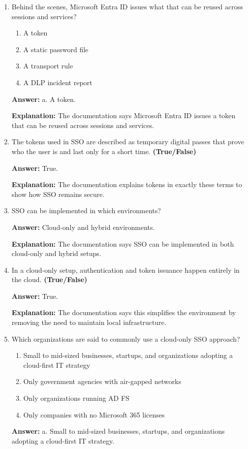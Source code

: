 \documentclass[10pt]{article}
\begin{document}
\begin{enumerate}[leftmargin=*]
\textbf{Explanation:} All of these services are explicitly named in the documentation as examples of SSO access across Microsoft and non-Microsoft apps.

\item Behind the scenes, Microsoft Entra ID issues what that can be reused across sessions and services?
\begin{enumerate}[label=\alph*., leftmargin=1.5em]
\item A token
\item A static password file
\item A transport rule
\item A DLP incident report
\end{enumerate}
\textbf{Answer:} a. A token.

\textbf{Explanation:} The documentation says Microsoft Entra ID issues a token that can be reused across sessions and services.

\item The tokens used in SSO are described as temporary digital passes that prove who the user is and last only for a short time. \textbf{(True/False)}

\textbf{Answer:} True.

\textbf{Explanation:} The documentation explains tokens in exactly these terms to show how SSO remains secure.

\item SSO can be implemented in which environments?

\textbf{Answer:} Cloud-only and hybrid environments.

\textbf{Explanation:} The documentation says SSO can be implemented in both cloud-only and hybrid setups.

\item In a cloud-only setup, authentication and token issuance happen entirely in the cloud. \textbf{(True/False)}

\textbf{Answer:} True.

\textbf{Explanation:} The documentation says this simplifies the environment by removing the need to maintain local infrastructure.

\item Which organizations are said to commonly use a cloud-only SSO approach?
\begin{enumerate}[label=\alph*., leftmargin=1.5em]
\item Small to mid-sized businesses, startups, and organizations adopting a cloud-first IT strategy
\item Only government agencies with air-gapped networks
\item Only organizations running AD FS
\item Only companies with no Microsoft 365 licenses
\end{enumerate}
\textbf{Answer:} a. Small to mid-sized businesses, startups, and organizations adopting a cloud-first IT strategy.


\end{enumerate}
\end{document}
